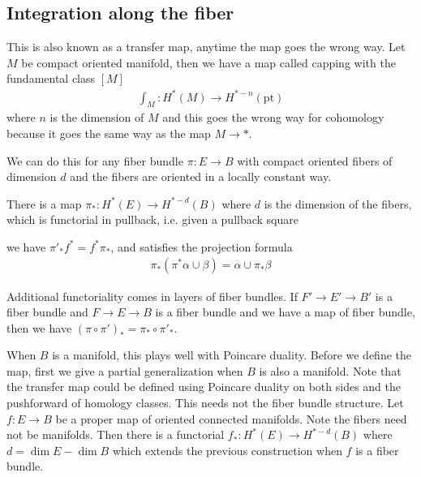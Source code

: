 \documentclass[12pt]{article}
\begin{document}
\subsection{Integration along the fiber}
This is also known as a transfer map, anytime the map goes the wrong way. Let $M$ be compact oriented manifold, then we have a map called capping with the fundamental class $[M]$ \begin{align*}
    \int_M: H^*(M) \to H^{*-n}(\mathrm{pt})
\end{align*} where $n$ is the dimension of $M$ and this goes the wrong way for cohomology because it goes the same way as the map $M \to *$.

We can do this for any fiber bundle $\pi: E \to B$ with compact oriented fibers of dimension $d$ and the fibers are oriented in a locally constant way. \begin{theorem}
    There is a map $\pi_*: H^*(E) \to H^{*-d}(B)$ where $d$ is the dimension of the fibers, which is functorial in pullback, i.e. given a pullback square \begin{center}
    \end{center}
    we have $\pi'_* f^* = f^* \pi_*$, and satisfies the projection formula \begin{align*}
        \pi_*(\pi^* \alpha \cup \beta) = \alpha \cup \pi_* \beta
    \end{align*}

Additional functoriality comes in layers of fiber bundles. If $F' \to E' \to B'$ is a fiber bundle and $F \to E \to B$ is a fiber bundle and we have a map of fiber bundle, then we have $(\pi \circ \pi')_* = \pi_* \circ \pi'_*$. 
\end{theorem}
When $B$ is a manifold, this plays well with Poincare duality. Before we define the map, first we give a partial generalization when $B$ is also a manifold. Note that the transfer map could be defined using Poincare duality on both sides and the pushforward of homology classes. This needs not the fiber bundle structure. Let $f:E\to B$ be a proper map of oriented connected manifolds. Note the fibers need not be manifolds. Then there is a functorial $f_*: H^*(E) \to H^{*-d}(B)$ where $d = \dim E - \dim B$ which extends the previous construction when $f$ is a fiber bundle. 
\end{document}
